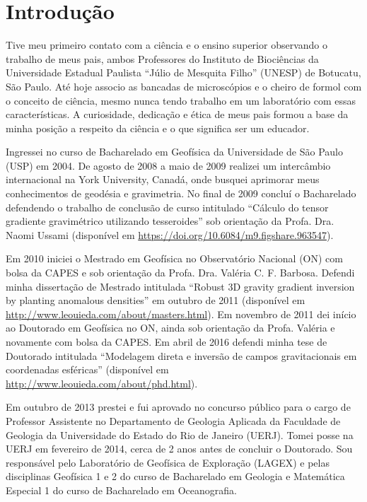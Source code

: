 \section{Introdução}


Tive meu primeiro contato com a ciência e o ensino superior observando o
trabalho de meus pais, ambos Professores do Instituto de Biociências da
Universidade Estadual Paulista ``Júlio de Mesquita Filho'' (UNESP) de Botucatu,
São Paulo.
Até hoje associo as bancadas de microscópios e o cheiro de formol com o
conceito de ciência, mesmo nunca tendo trabalho em um laboratório com essas
características.
A curiosidade, dedicação e ética de meus pais formou a base da minha posição a
respeito da ciência e o que significa ser um educador.

Ingressei no curso de Bacharelado em Geofísica da Universidade de São
Paulo (USP) em 2004.
De agosto de 2008 a maio de 2009 realizei um intercâmbio internacional na York
University, Canadá, onde busquei aprimorar meus conhecimentos de geodésia e
gravimetria.
No final de 2009 concluí o Bacharelado defendendo o trabalho de conclusão de
curso intitulado ``Cálculo do tensor gradiente gravimétrico utilizando
tesseroides'' sob orientação da Profa. Dra. Naomi Ussami
(disponível em \url{https://doi.org/10.6084/m9.figshare.963547}).

Em 2010 iniciei o Mestrado em Geofísica no Observatório Nacional (ON) com bolsa
da CAPES e sob orientação da Profa. Dra. Valéria C. F. Barbosa.
Defendi minha dissertação de Mestrado intitulada ``Robust 3D gravity gradient
inversion by planting anomalous densities'' em outubro de 2011 (disponível em
\url{http://www.leouieda.com/about/masters.html}).
Em novembro de 2011 dei início ao Doutorado em Geofísica no ON, ainda sob
orientação da Profa. Valéria e novamente com bolsa da CAPES.
Em abril de 2016 defendi minha tese de Doutorado intitulada ``Modelagem direta
e inversão de campos gravitacionais em coordenadas esféricas''
(disponível em \url{http://www.leouieda.com/about/phd.html}).

Em outubro de 2013 prestei e fui aprovado no concurso público para o cargo de
Professor Assistente no Departamento de Geologia Aplicada da Faculdade de
Geologia da Universidade do Estado do Rio de Janeiro (UERJ).
Tomei posse na UERJ em fevereiro de 2014, cerca de 2 anos antes de concluir o
Doutorado.
Sou responsável pelo Laboratório de Geofísica de Exploração (LAGEX) e pelas
disciplinas Geofísica 1 e 2 do curso de Bacharelado em Geologia e Matemática
Especial 1 do curso de Bacharelado em Oceanografia.

